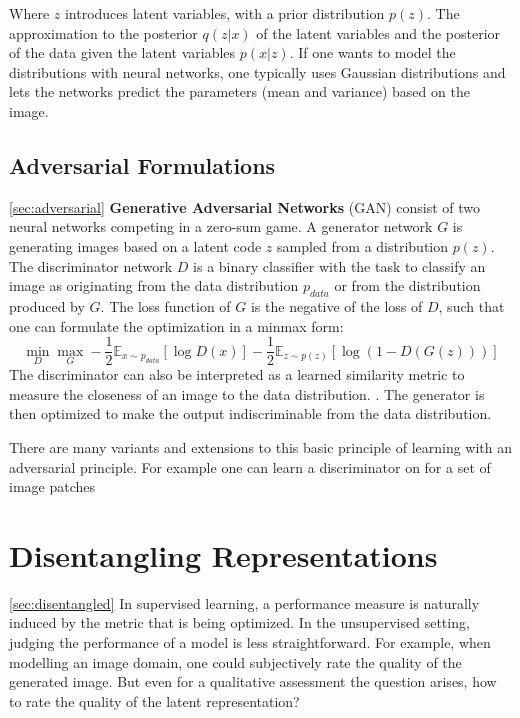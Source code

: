 		Where $z$ introduces latent variables, with a prior distribution $p(z)$. The approximation to the posterior $q(z|x)$ of the latent variables and the posterior of the data given the latent variables $p(x|z)$. If one wants to model the distributions with neural networks, one typically uses Gaussian distributions and lets the networks predict the parameters (mean and variance) based on the image.

	\subsection{Adversarial Formulations}\ref{sec:adversarial}
		\textbf{Generative Adversarial Networks} (GAN) consist of two neural networks competing in a zero-sum game. A generator network $G$ is generating images based on a latent code $z$ sampled from a distribution $p(z)$. The discriminator network $D$ is a binary classifier with the task to classify an image as originating from the data distribution $p_{data}$ or from the distribution produced by $G$. The loss function of $G$ is the negative of the loss of $D$, such that one can formulate the optimization in a minmax form:
		\begin{equation}
				\min_D \max_G - \frac{1}{2} \mathds{E}_{x\sim p_{data}}[\log D(x)] - \frac{1}{2}\mathds{E}_{z\sim p(z)}[\log (1-D(G(z)))]
		\end{equation}
		The discriminator can also be interpreted as a learned similarity metric to measure the closeness of an image to the data distribution. \cite{Larsen2015AutoencodingMetric}. The generator is then optimized to make the output indiscriminable from the data distribution.

		There are many variants and extensions to this basic principle of learning with an adversarial principle. For example one can learn a discriminator on for a set of image patches 

\section{Disentangling Representations}\ref{sec:disentangled}
	In supervised learning, a performance measure is naturally induced by the metric that is being optimized. In the unsupervised setting, judging the performance of a model is less straightforward. For example, when modelling an image domain, one could subjectively rate the quality of the generated image. But even for a qualitative assessment the question arises, how to rate the quality of the latent representation?

